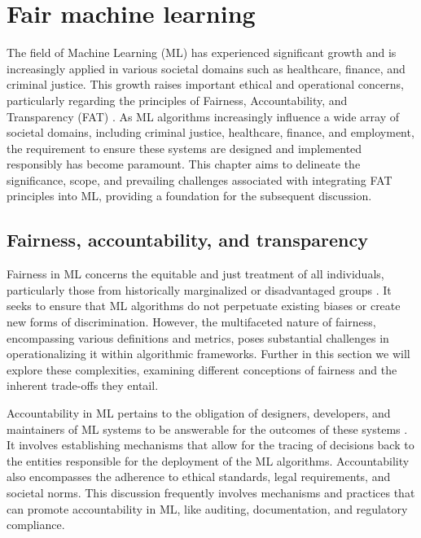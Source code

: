 
\chapter{Fair machine learning}\label{chap:fairness}

The field of Machine Learning (ML) has experienced significant growth and is increasingly applied in various societal domains such as healthcare, finance, and criminal justice. This growth raises important ethical and operational concerns, particularly regarding the principles of Fairness, Accountability, and Transparency (FAT) \citep{Memarian2023}. As ML algorithms increasingly influence a wide array of societal domains, including criminal justice, healthcare, finance, and employment, the requirement to ensure these systems are designed and implemented responsibly has become paramount. This chapter aims to delineate the significance, scope, and prevailing challenges associated with integrating FAT principles into ML, providing a foundation for the subsequent discussion.

\section{Fairness, accountability, and transparency }

Fairness in ML concerns the equitable and just treatment of all individuals, particularly those from historically marginalized or disadvantaged groups \citep{Mehrabi2019, caton2023}. It seeks to ensure that ML algorithms do not perpetuate existing biases or create new forms of discrimination. However, the multifaceted nature of fairness, encompassing various definitions and metrics, poses substantial challenges in operationalizing it within algorithmic frameworks. Further in this section we will explore these complexities, examining different conceptions of fairness and the inherent trade-offs they entail.

Accountability in ML pertains to the obligation of designers, developers, and maintainers of ML systems to be answerable for the outcomes of these systems \citep{Hutchinson2021}. It involves establishing mechanisms that allow for the tracing of decisions back to the entities responsible for the deployment of the ML algorithms. Accountability also encompasses the adherence to ethical standards, legal requirements, and societal norms. This discussion frequently involves mechanisms and practices that can promote accountability in ML, like auditing, documentation, and regulatory compliance.

